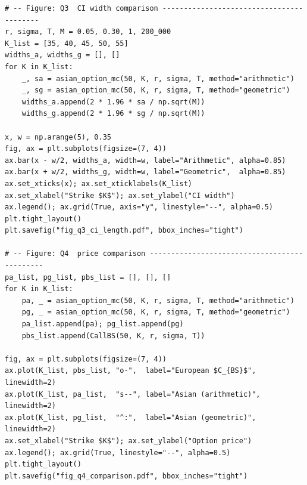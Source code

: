 \documentclass[11pt,a4paper]{article}
\theoremstyle{plain}
\theoremstyle{definition}
\begin{document}
\begin{lstlisting}[style=pythonstyle,
  caption={Code for Figures~\ref{fig:ci} and~\ref{fig:compare}.}]
# -- Figure: Q3  CI width comparison -----------------------------------------
r, sigma, T, M = 0.05, 0.30, 1, 200_000
K_list = [35, 40, 45, 50, 55]
widths_a, widths_g = [], []
for K in K_list:
    _, sa = asian_option_mc(50, K, r, sigma, T, method="arithmetic")
    _, sg = asian_option_mc(50, K, r, sigma, T, method="geometric")
    widths_a.append(2 * 1.96 * sa / np.sqrt(M))
    widths_g.append(2 * 1.96 * sg / np.sqrt(M))

x, w = np.arange(5), 0.35
fig, ax = plt.subplots(figsize=(7, 4))
ax.bar(x - w/2, widths_a, width=w, label="Arithmetic", alpha=0.85)
ax.bar(x + w/2, widths_g, width=w, label="Geometric",  alpha=0.85)
ax.set_xticks(x); ax.set_xticklabels(K_list)
ax.set_xlabel("Strike $K$"); ax.set_ylabel("CI width")
ax.legend(); ax.grid(True, axis="y", linestyle="--", alpha=0.5)
plt.tight_layout()
plt.savefig("fig_q3_ci_length.pdf", bbox_inches="tight")

# -- Figure: Q4  price comparison ---------------------------------------------
pa_list, pg_list, pbs_list = [], [], []
for K in K_list:
    pa, _ = asian_option_mc(50, K, r, sigma, T, method="arithmetic")
    pg, _ = asian_option_mc(50, K, r, sigma, T, method="geometric")
    pa_list.append(pa); pg_list.append(pg)
    pbs_list.append(CallBS(50, K, r, sigma, T))

fig, ax = plt.subplots(figsize=(7, 4))
ax.plot(K_list, pbs_list, "o-",  label="European $C_{BS}$", linewidth=2)
ax.plot(K_list, pa_list,  "s--", label="Asian (arithmetic)", linewidth=2)
ax.plot(K_list, pg_list,  "^:",  label="Asian (geometric)",  linewidth=2)
ax.set_xlabel("Strike $K$"); ax.set_ylabel("Option price")
ax.legend(); ax.grid(True, linestyle="--", alpha=0.5)
plt.tight_layout()
plt.savefig("fig_q4_comparison.pdf", bbox_inches="tight")
\end{lstlisting}
\end{document}
